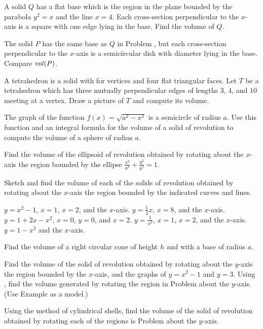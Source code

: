 \begin{exercises}

A solid $Q$ has a flat base which is the region
in the plane bounded by the parabola
$y^2=x$ and the line $x=4$.  Each cross-section
perpendicular to the $x$-axis is a square
with one edge lying in the base.
Find the volume of $Q$.

The solid $P$ has the same base as $Q$ in
Problem , but each cross-section
perpendicular to the $x$-axis is a semicircular
disk with diameter lying in the base.
Compare $\mbox{\emph{vol}}(P)$.

A tetrahedron is a solid with for vertices and four
flat triangular faces.  Let $T$ be a tetrahedron
which has three mutually perpendicular edges
of lengths $3$, $4$, and $10$ meeting
at a vertex.
Draw a picture of $T$ and compute its volume.

The graph of the function $f(x) = \sqrt{a^2-x^2}$
is a semicircle of radius $a$.
Use this function and an integral formula
for the volume of a solid of revolution to compute
the volume of a sphere of radius $a$.

Find the volume of the ellipsoid of revolution
obtained by rotating about the $x$-axis
the region bounded by the ellipse
$\frac{x^2}{a^2}+\frac{y^2}{b^2} = 1$.

Sketch and find the volume of each of the solids
of revolution obtained by rotating about the
$x$-axis the region bounded by the indicated
curves and lines.
\begin{exenum}
\x
{}
$y=x^2-1$, $x=1$, $x=2$, and the $x$-axis.
\x
$y=\frac12x$, $x=8$, and the $x$-axis.
\x
$y=1+2x-x^2$, $x=0$, $y=0$, and $x=2$.
\x
$y=\frac1{x^2}$, $x=1$, $x=2$, and the $x$-axis.
\x
$y=1-x^2$ and the $x$-axis.
\end{exenum}

Find the volume of a right circular cone of
height $h$ and with a base of radius $a$.

\begin{exenum}
\x
{}
Find the volume of the solid of revolution obtained
by rotating about the $y$-axis the region bounded
by the $x$-axis, and the graphs of $y=x^2-1$
and $y=3$.
\x
Using , find the volume generated
by rotating the region in Problem 
about the $y$-axis.
(Use Example  as a model.)
\end{exenum}

Using the method of cylindrical shells,
find the volume of the solid of revolution
obtained by rotating each of the regions is
Problem  about the $y$-axis.


\end{exercises}
